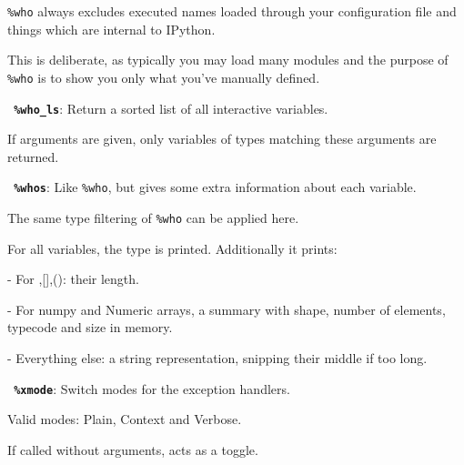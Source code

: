         \texttt{\%who} always excludes executed names loaded through your configuration
        file and things which are internal to IPython.

        This is deliberate, as typically you may load many modules and the
        purpose of \texttt{\%who} is to show you only what you've manually defined.

\bigskip
\texttt{\textbf{ \%who\_ls}}:
	Return a sorted list of all interactive variables.

        If arguments are given, only variables of types matching these
        arguments are returned.

\bigskip
\texttt{\textbf{ \%whos}}:
	Like \texttt{\%who}, but gives some extra information about each variable.

        The same type filtering of \texttt{\%who} can be applied here.

        For all variables, the type is printed. Additionally it prints:
        
          - For {},[],(): their length.

          - For numpy and Numeric arrays, a summary with shape, number of
          elements, typecode and size in memory.

          - Everything else: a string representation, snipping their middle if
          too long.

\bigskip
\texttt{\textbf{ \%xmode}}:
	Switch modes for the exception handlers.

        Valid modes: Plain, Context and Verbose.

        If called without arguments, acts as a toggle.

